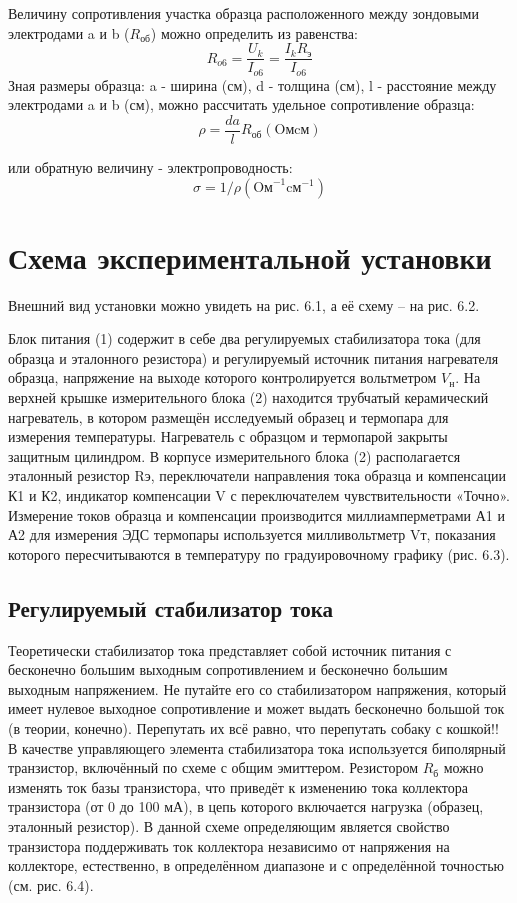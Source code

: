 Величину сопротивления участка образца расположенного между зондовыми электродами a и b ($R_{\text{об}}$) можно определить из равенства:
$$R_{o 6}=\frac{U_{k}}{I_{o 6}}=\frac{I_{k} R_{\text{э}}}{I_{o 6}}$$
Зная размеры образца: a - ширина (см), d - толщина (см), l - расстояние между электродами a и b (см), можно рассчитать удельное сопротивление образца:
$$\rho=\frac{d a}{l} R_{\text{об}} (\text{Oм} \text{cм})$$

или обратную величину - электропроводность: 
$$\sigma=1 / \rho\left(\text{Oм}^{-1} \text{cм}^{-1}\right)$$

\section{Схема экспериментальной установки}
Внешний вид установки можно увидеть на рис. 6.1, а её схему – на рис. 6.2. 


Блок питания (1) содержит в себе два регулируемых стабилизатора тока (для образца и эталонного резистора) и регулируемый источник питания нагревателя образца, напряжение на выходе которого контролируется вольтметром $V_\text{н}$. На верхней крышке измерительного блока (2) находится трубчатый керамический нагреватель, в котором размещён исследуемый образец и термопара для измерения температуры. Нагреватель с образцом и термопарой закрыты защитным цилиндром. В корпусе измерительного блока (2) располагается эталонный резистор Rэ, переключатели направления тока образца и компенсации К1 и К2, индикатор компенсации V с переключателем чувствительности «Точно». Измерение токов образца и компенсации производится миллиамперметрами А1 и А2 для измерения ЭДС термопары используется милливольтметр Vт, показания которого пересчитываются в температуру по градуировочному графику (рис. 6.3).



\subsection{Регулируемый стабилизатор тока}
Теоретически стабилизатор тока представляет собой источник питания с бесконечно большим выходным сопротивлением и бесконечно большим выходным напряжением. Не путайте его со стабилизатором напряжения, который имеет нулевое выходное сопротивление и может выдать бесконечно большой ток (в теории, конечно). Перепутать их всё равно, что перепутать собаку с кошкой!!
В качестве управляющего элемента стабилизатора тока используется биполярный транзистор, включённый по схеме с общим эмиттером. Резистором $R_\text{б}$ можно изменять ток базы транзистора, что приведёт к изменению тока коллектора транзистора (от 0 до 100 мА), в цепь которого включается нагрузка (образец, эталонный резистор). В данной схеме определяющим является свойство транзистора поддерживать ток коллектора независимо от напряжения на коллекторе, естественно, в определённом диапазоне и с определённой точностью (см. рис. 6.4).

